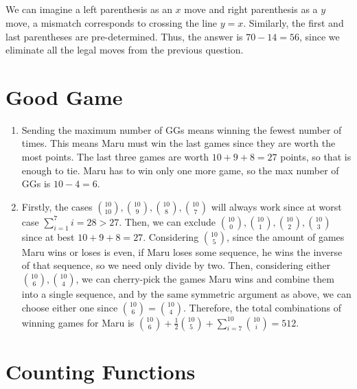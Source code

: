 \documentclass{article}
\begin{document}
\subsection{}

We can imagine a left parenthesis as an \(x\) move and right parenthesis as a \(y\) move, a mismatch corresponds to crossing the line \(y = x\).
Similarly, the first and last parentheses are pre-determined.
Thus, the answer is \(70 - 14 = 56\), since we eliminate all the legal moves from the previous question.

\subsection{}

\section{Good Game}

\begin{enumerate}
    \item Sending the maximum number of GGs means winning the fewest number of times.
    This means Maru must win the last games since they are worth the most points.
    The last three games are worth \(10 + 9 + 8 = 27\) points, so that is enough to tie.
    Maru has to win only one more game, so the max number of GGs is \(10 - 4 = 6\).
    \item Firstly, the cases \(\binom{10}{10}, \binom{10}{9}, \binom{10}{8}, \binom{10}{7}\) will always work since at worst case \(\sum_{i = 1}^7 i = 28 > 27\).
    Then, we can exclude \(\binom{10}{0}, \binom{10}{1}, \binom{10}{2}, \binom{10}{3}\) since at best \(10 + 9 + 8 = 27\).
    Considering \(\binom{10}{5}\), since the amount of games Maru wins or loses is even, if Maru loses some sequence, he wins the inverse of that sequence, so we need only divide by two.
    Then, considering either \(\binom{10}{6}, \binom{10}{4}\), we can cherry-pick the games Maru wins and combine them into a single sequence, and by the same symmetric argument as above, we can choose either one since \(\binom{10}{6} = \binom{10}{4}\).
    Therefore, the total combinations of winning games for Maru is \(\binom{10}{6} + \frac{1}{2} \binom{10}{5} + \sum_{i = 7}^{10} \binom{10}{i} = 512\).
\end{enumerate}

\section{Counting Functions}
\end{document}

